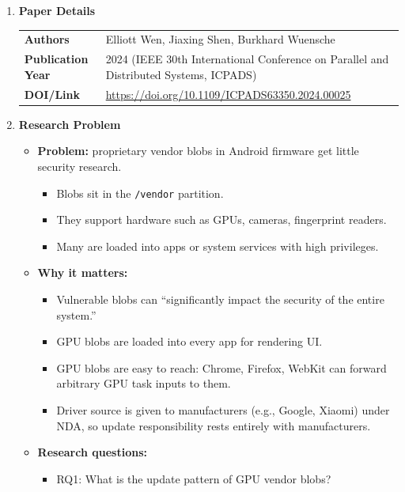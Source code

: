 \documentclass[11pt,a4paper]{article}
\newcommand{\entrypart}[1]{\textbf{\color{accent}#1}\par\vspace{2pt}}
\begin{document}
\begin{enumerate}

    \item \entrypart{Paper Details}

    \begin{tabular}{@{}>{\bfseries}p{3.2cm} p{11.5cm}@{}}
        Authors          & Elliott Wen, Jiaxing Shen, Burkhard Wuensche \\[2pt]
        Publication Year & 2024 (IEEE 30th International Conference on Parallel and Distributed Systems, ICPADS) \\[2pt]
        DOI/Link         & \url{https://doi.org/10.1109/ICPADS63350.2024.00025}
    \end{tabular}

    \item \entrypart{Research Problem}
    \begin{itemize}[leftmargin=*, itemsep=1pt, topsep=2pt]
        \item \textbf{Problem:} proprietary vendor blobs in Android firmware get little security research.
        \begin{itemize}[itemsep=0pt]
            \item Blobs sit in the \texttt{/vendor} partition.
            \item They support hardware such as GPUs, cameras, fingerprint readers.
            \item Many are loaded into apps or system services with high privileges.
        \end{itemize}
        \item \textbf{Why it matters:}
        \begin{itemize}[itemsep=0pt]
            \item Vulnerable blobs can ``significantly impact the security of the entire system.''
            \item GPU blobs are loaded into every app for rendering UI.
            \item GPU blobs are easy to reach: Chrome, Firefox, WebKit can forward arbitrary GPU task inputs to them.
            \item Driver source is given to manufacturers (e.g., Google, Xiaomi) under NDA, so update responsibility rests entirely with manufacturers.
        \end{itemize}
        \item \textbf{Research questions:}
        \begin{itemize}[itemsep=0pt]
            \item RQ1: What is the update pattern of GPU vendor blobs?

\end{itemize}
\end{itemize}
\end{enumerate}
\end{document}
